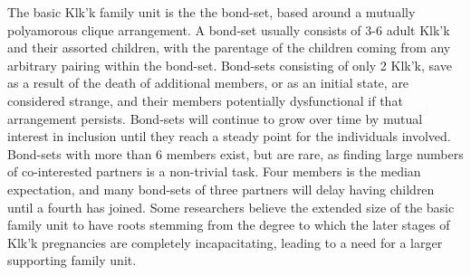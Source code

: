 The basic Klk'k family unit is the the bond-set, based around a
mutually polyamorous clique arrangement. A bond-set usually consists
of 3-6 adult Klk'k and their assorted children, with the parentage of
the children coming from any arbitrary pairing within the
bond-set. Bond-sets consisting of only 2 Klk'k, save as a result of
the death of additional members, or as an initial state, are
considered strange, and their members potentially dysfunctional if
that arrangement persists. Bond-sets will continue to grow over time
by mutual interest in inclusion until they reach a steady point for
the individuals involved. Bond-sets with more than 6 members exist,
but are rare, as finding large numbers of co-interested partners is a
non-trivial task. Four members is the median expectation, and many
bond-sets of three partners will delay having children until a fourth
has joined. Some researchers believe the extended size of the basic
family unit to have roots stemming from the degree to which the later
stages of Klk'k pregnancies are completely incapacitating, leading to
a need for a larger supporting family unit.
